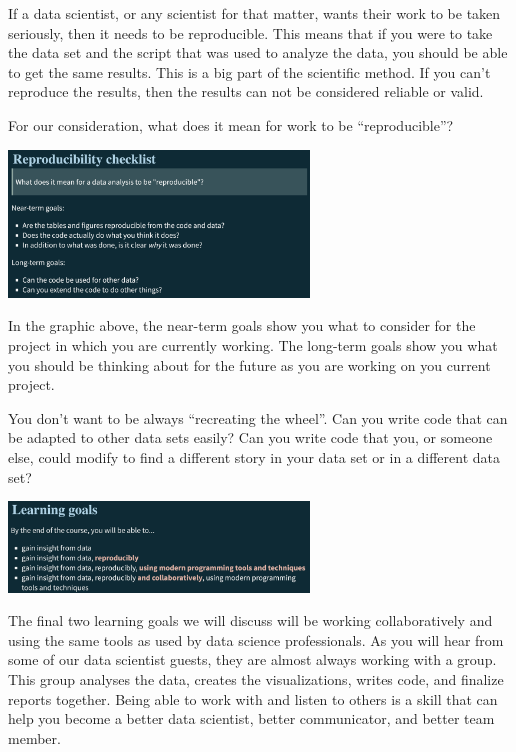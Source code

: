 \documentclass[
  letterpaper,
  DIV=11,
  numbers=noendperiod]{scrreprt}
\begin{document}
If a data scientist, or any scientist for that matter, wants their work
to be taken seriously, then it needs to be reproducible. This means that
if you were to take the data set and the script that was used to analyze
the data, you should be able to get the same results. This is a big part
of the scientific method. If you can't reproduce the results, then the
results can not be considered reliable or valid.

For our consideration, what does it mean for work to be
``reproducible''?

\includegraphics[width=0.6\textwidth,height=\textheight]{./images/WIDS-10.jpg}

In the graphic above, the near-term goals show you what to consider for
the project in which you are currently working. The long-term goals show
you what you should be thinking about for the future as you are working
on you current project.

You don't want to be always ``recreating the wheel''. Can you write code
that can be adapted to other data sets easily? Can you write code that
you, or someone else, could modify to find a different story in your
data set or in a different data set?

\includegraphics[width=0.6\textwidth,height=\textheight]{./images/WIDS-12.jpg}

The final two learning goals we will discuss will be working
collaboratively and using the same tools as used by data science
professionals. As you will hear from some of our data scientist guests,
they are almost always working with a group. This group analyses the
data, creates the visualizations, writes code, and finalize reports
together. Being able to work with and listen to others is a skill that
can help you become a better data scientist, better communicator, and
better team member.
\end{document}
